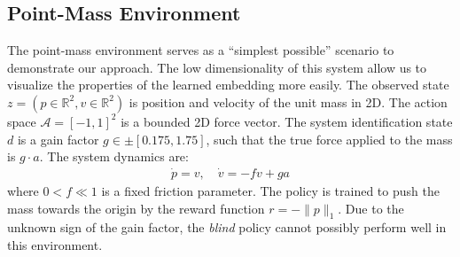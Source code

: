 \documentclass{article}
\newcommand{\R}{\mathbb{R}}
\newcommand{\TODO}[1]{\textcolor{red}{\textbf{TODO: #1}}}
\newcommand{\cA}{\mathcal{A}}
\newcommand{\blind}{\emph{blind}}
\newcommand{\plain}{\emph{plain}}
\newcommand{\embed}{\emph{E2ID}}
\newcommand{\obvar}{z}
\newcommand{\idvar}{d}
\begin{document}
\subsection{Point-Mass Environment}
\label{pointmass}
The point-mass environment serves as a ``simplest possible'' scenario to demonstrate our approach.
The low dimensionality of this system allow us to visualize the properties of the learned embedding more easily.
The observed state $\obvar = (p \in \R^2, v \in \R^2)$ is position and velocity of the unit mass in 2D.
The action space $\cA = [-1, 1]^2$ is a bounded 2D force vector.
The system identification state $\idvar$ is a gain factor $g \in \pm[0.175, 1.75]$,
such that the true force applied to the mass is $g \cdot a$.
The system dynamics are:
\begin{equation}\begin{split}
\dot p = v, \quad \dot v = -f v + ga
\end{split}\end{equation}
where $0 < f \ll 1$ is a fixed friction parameter.
The policy is trained to push the mass towards the origin
by the reward function $r = -\|p\|_1$.
Due to the unknown sign of the gain factor, the \blind{} policy cannot possibly perform well in this environment.

\end{document}
